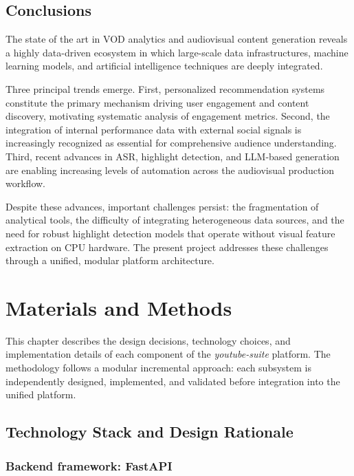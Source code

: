 \documentclass[ENG]{TFUOC}
\begin{document}
\section{Conclusions}

The state of the art in VOD analytics and audiovisual content generation reveals a highly data-driven ecosystem in which large-scale data infrastructures, machine learning models, and artificial intelligence techniques are deeply integrated.

Three principal trends emerge. First, personalized recommendation systems constitute the primary mechanism driving user engagement and content discovery, motivating systematic analysis of engagement metrics. Second, the integration of internal performance data with external social signals is increasingly recognized as essential for comprehensive audience understanding. Third, recent advances in ASR, highlight detection, and LLM-based generation are enabling increasing levels of automation across the audiovisual production workflow.

Despite these advances, important challenges persist: the fragmentation of analytical tools, the difficulty of integrating heterogeneous data sources, and the need for robust highlight detection models that operate without visual feature extraction on CPU hardware. The present project addresses these challenges through a unified, modular platform architecture.


\chapter{Materials and Methods}

This chapter describes the design decisions, technology choices, and implementation details of each component of the \textit{youtube-suite} platform. The methodology follows a modular incremental approach: each subsystem is independently designed, implemented, and validated before integration into the unified platform.

\section{Technology Stack and Design Rationale}

\subsection*{Backend framework: FastAPI}
\end{document}
